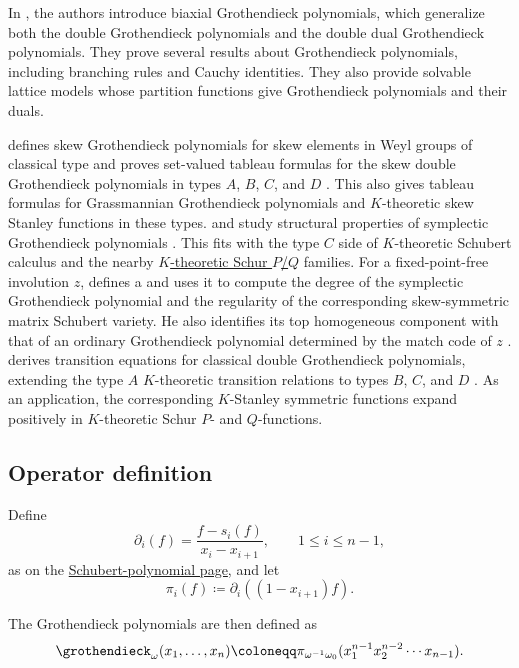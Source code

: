 In \cite{BrubakerFrechetteHardtTiborWeber2020x}, the authors
introduce biaxial Grothendieck polynomials, which generalize both the double Grothendieck polynomials and
the double dual Grothendieck polynomials.
They prove several results about Grothendieck polynomials, including branching
rules and Cauchy identities.  They also provide solvable lattice models whose partition
functions give Grothendieck polynomials and their duals.

 defines skew Grothendieck polynomials for skew elements
in Weyl groups of classical type and proves set-valued tableau formulas for
the skew double Grothendieck polynomials in types $A$, $B$, $C$, and $D$
\cite{Tamvakis2024}.  This also gives tableau formulas for Grassmannian
Grothendieck polynomials and $K$-theoretic skew Stanley functions in these
types.
 and  study structural properties
of symplectic Grothendieck polynomials \cite{MarbergPawlowski2021}.  This
fits with the type $C$ side of $K$-theoretic Schubert calculus and the nearby
\hyperref[schurKPQ]{$K$-theoretic Schur $P$/$Q$} families.
For a fixed-point-free involution $z$,  defines a
\label{symplecticRajchgotIndex} and uses it
to compute the degree of the symplectic
Grothendieck polynomial and the regularity of the corresponding
skew-symmetric matrix Schubert variety.  He also identifies its top
homogeneous component with that of an ordinary Grothendieck polynomial
determined by the match code of $z$
\cite[Thms.~1.1--1.2 and Cor.~1.3]{Chou2026SymplecticRegularity}.
 derives transition equations for classical double
Grothendieck polynomials, extending the type $A$ $K$-theoretic transition
relations to types $B$, $C$, and $D$ \cite{Marberg2025x}.  As an application,
the corresponding $K$-Stanley symmetric functions expand positively in
$K$-theoretic Schur $P$- and $Q$-functions.



\subsection[grothendieckOperatorformula]{Operator definition}

Define
\[
  \partial_i(f)=\frac{f-s_i(f)}{x_i-x_{i+1}},
  \qquad 1 \leq i \leq n-1,
\]
as on the \hyperref[schubertOperatorformula]{Schubert-polynomial page}, and let
\[
  \pi_i(f) \coloneqq \partial_i((1-x_{i+1})f).
\]

The Grothendieck polynomials are then defined as
\begin{equation*}
 \grothendieck_\omega(x_1,\dotsc,x_n)
 \coloneqq
 \pi_{\omega^{-1}\omega_0}(x_1^{n-1}x_2^{n-2}\dotsm x_{n-1}).
\end{equation*}

